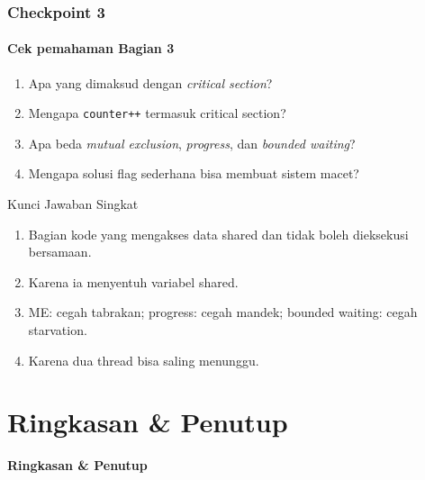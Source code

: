 \documentclass[t,aspectratio=169,xcolor=dvipsnames]{beamer}
\begin{document}
\begin{frame}
    \frametitle{Checkpoint 3}
    \framesubtitle{Cek pemahaman Bagian 3}
    \scriptsize

    \begin{enumerate}
        \item Apa yang dimaksud dengan \textit{critical section}?
        \item Mengapa \texttt{counter++} termasuk critical section?
        \item Apa beda \textit{mutual exclusion}, \textit{progress}, dan \textit{bounded waiting}?
        \item Mengapa solusi flag sederhana bisa membuat sistem macet?
    \end{enumerate}

    \vspace{0.3cm}
    \begin{block}{Kunci Jawaban Singkat}
        \begin{enumerate}
            \item Bagian kode yang mengakses data shared dan tidak boleh dieksekusi bersamaan.
            \item Karena ia menyentuh variabel shared.
            \item ME: cegah tabrakan; progress: cegah mandek; bounded waiting: cegah starvation.
            \item Karena dua thread bisa saling menunggu.
        \end{enumerate}
    \end{block}
\end{frame}

\section{Ringkasan \& Penutup}

\begin{frame}[plain]
    \begin{center}
        \vspace{3cm}
        \Huge\textbf{Ringkasan \& Penutup}
    \end{center}
\end{frame}
\end{document}
